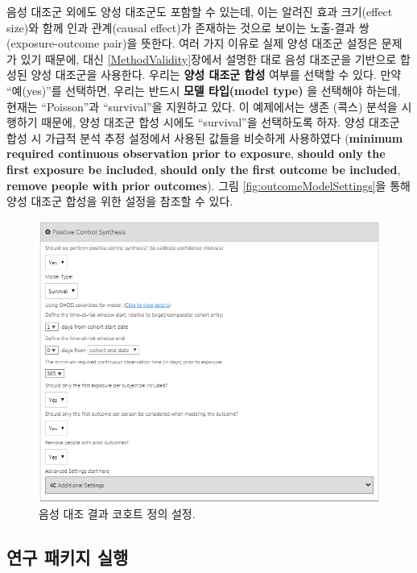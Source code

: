 \documentclass[11pt]{book}
\theoremstyle{definition}
\theoremstyle{definition}
\theoremstyle{definition}
\theoremstyle{remark}
\begin{document}
음성 대조군 외에도 양성 대조군도 포함할 수 있는데, 이는 알려진 효과
크기(effect size)와 함께 인과 관계(causal effect)가 존재하는 것으로
보이는 노출-결과 쌍(exposure-outcome pair)을 뜻한다. 여러 가지 이유로
실제 양성 대조군 설정은 문제가 있기 때문에, 대신
\ref{MethodValidity}장에서 설명한 대로 음성 대조군을 기반으로 합성된
양성 대조군을 사용한다. 우리는 \textbf{양성 대조군 합성} 여부를 선택할
수 있다. 만약 ``예(yes)''를 선택하면, 우리는 반드시 \textbf{모델
타입(model type)} 을 선택해야 하는데, 현재는 ``Poisson''과
``survival''을 지원하고 있다. 이 예제에서는 생존 (콕스) 분석을 시행하기
때문에, 양성 대조군 합성 시에도 ``survival''을 선택하도록 하자. 양성
대조군 합성 시 가급적 분석 추정 설정에서 사용된 값들을 비슷하게
사용하였다 (\textbf{minimum required continuous observation prior to
exposure}, \textbf{should only the first exposure be included},
\textbf{should only the first outcome be included}, \textbf{remove
people with prior outcomes}). 그림 \ref{fig:outcomeModelSettings}을 통해
양성 대조군 합성을 위한 설정을 참조할 수 있다.

\begin{figure}

{\centering \includegraphics[width=1\linewidth]{images/PopulationLevelEstimation/pcSynthesis} 

}

\caption{음성 대조 결과 코호트 정의 설정.}\label{fig:pcSynthesis}
\end{figure}

\subsection{연구 패키지 실행}\label{--}
\end{document}
